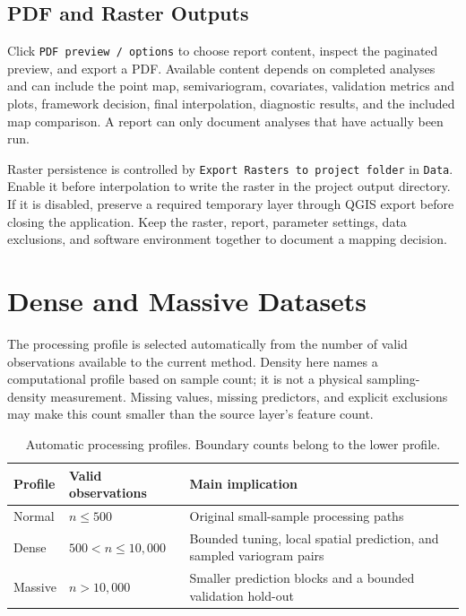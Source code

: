 \documentclass[11pt,a4paper]{article}
\begin{document}
\subsection{PDF and Raster Outputs}

Click \texttt{PDF preview / options} to choose report content, inspect the paginated preview, and export a PDF. Available content depends on completed analyses and can include the point map, semivariogram, covariates, validation metrics and plots, framework decision, final interpolation, diagnostic results, and the included map comparison. A report can only document analyses that have actually been run.

Raster persistence is controlled by \texttt{Export Rasters to project folder} in \texttt{Data}. Enable it before interpolation to write the raster in the project output directory. If it is disabled, preserve a required temporary layer through QGIS export before closing the application. Keep the raster, report, parameter settings, data exclusions, and software environment together to document a mapping decision.

\section{Dense and Massive Datasets}
\label{sec:dense-massive}

The processing profile is selected automatically from the number of valid observations available to the current method. Density here names a computational profile based on sample count; it is not a physical sampling-density measurement. Missing values, missing predictors, and explicit exclusions may make this count smaller than the source layer's feature count.

\begin{table}[H]
\centering
\caption{Automatic processing profiles. Boundary counts belong to the lower profile.}
\label{tab:data-profiles}
\begin{tabularx}{0.96\textwidth}{P{2cm}P{3cm}Y}
\toprule
\textbf{Profile} & \textbf{Valid observations} & \textbf{Main implication} \\
\midrule
Normal & $n\leq500$ & Original small-sample processing paths \\
Dense & $500<n\leq10{,}000$ & Bounded tuning, local spatial prediction, and sampled variogram pairs \\
Massive & $n>10{,}000$ & Smaller prediction blocks and a bounded validation hold-out \\
\bottomrule
\end{tabularx}
\end{table}
\end{document}
